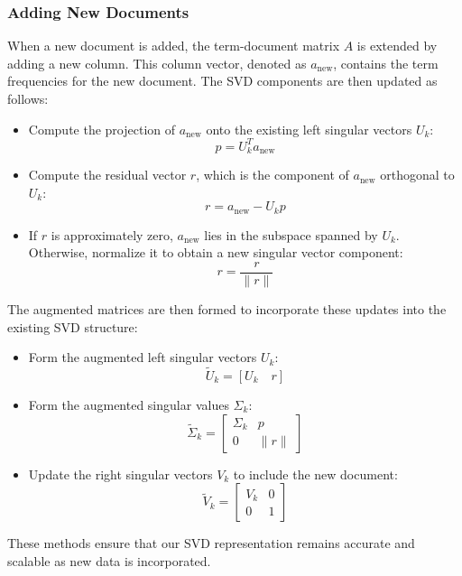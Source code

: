 \documentclass[12pt,a4paper]{article}
\begin{document}
\subsubsection{Adding New Documents}
When a new document is added, the term-document matrix $A$ is extended by adding a new column. This column vector, denoted as $a_{\text{new}}$, contains the term frequencies for the new document. The SVD components are then updated as follows:
\begin{itemize}
    \item Compute the projection of $a_{\text{new}}$ onto the existing left singular vectors $U_k$: 
    \[
    p = U_k^T a_{\text{new}}
    \]
    \item Compute the residual vector $r$, which is the component of $a_{\text{new}}$ orthogonal to $U_k$: 
    \[
    r = a_{\text{new}} - U_k p
    \]
    \item If $r$ is approximately zero, $a_{\text{new}}$ lies in the subspace spanned by $U_k$. Otherwise, normalize it to obtain a new singular vector component: 
    \[
    r = \frac{r}{\|r\|}
    \]
\end{itemize}
The augmented matrices are then formed to incorporate these updates into the existing SVD structure:
\begin{itemize}
    \item Form the augmented left singular vectors $U_k$:
    \[
    \tilde{U}_k = [U_k \quad r]
    \]
    \item Form the augmented singular values $\Sigma_k$:
    \[
    \tilde{\Sigma}_k = \begin{bmatrix}
    \Sigma_k & p \\
    0 & \|r\|
    \end{bmatrix}
    \]
    \item Update the right singular vectors $V_k$ to include the new document:
    \[
    \tilde{V}_k = \begin{bmatrix}
    V_k & 0 \\
    0 & 1
    \end{bmatrix}
    \]
\end{itemize}
These methods ensure that our SVD representation remains accurate and scalable as new data is incorporated.
\end{document}
